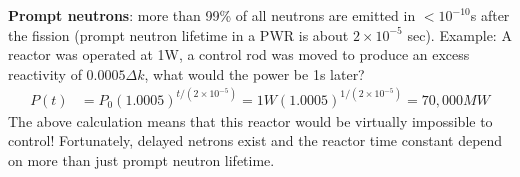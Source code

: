 \documentclass{school-22.211-notes}
\date{April 25, 2012}
\begin{document}
\maketitle

\textbf{Prompt neutrons}: more than 99\% of all neutrons are emitted in $<10^{-10}$s after the fission (prompt neutron lifetime in a PWR is about $2 \times 10^{-5}$ sec). Example: A reactor was operated at 1W, a control rod was moved to produce an excess reactivity of $0.0005 \Delta k$, what would the power be 1s later? 
\begin{align}
P(t) &= P_0 (1.0005)^{t/(2\times 10^{-5})} = 1 W (1.0005)^{1/(2\times 10^{-5})} = 70,000 MW 
\end{align}
The above calculation means that this reactor would be virtually impossible to control! Fortunately, delayed netrons exist and the reactor time constant depend on more than just prompt neutron lifetime. 
\end{document}
